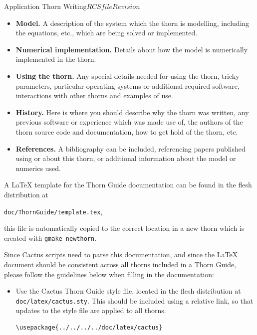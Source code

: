 \begin{cactuspart}{Application Thorn Writing}{$RCSfile$}{$Revision$}
\begin{itemize}

  \item{\bf Model.} A description of the system which the thorn is modelling,
    including the equations, etc., which are being solved or implemented.

  \item{\bf Numerical implementation.} Details about how the model is
    numerically implemented in the thorn.

  \item{\bf Using the thorn.} Any special details needed for using the
    thorn, tricky parameters, particular operating systems or additional
    required software, interactions with other thorns and examples of use.

  \item{\bf History.} Here is where you should describe why the thorn
    was written, any previous software or experience which was made use of,
    the authors of the thorn source code and documentation, how to get
    hold of the thorn, etc.

  \item{\bf References.} A bibliography can be included, referencing papers
    published using or about this thorn, or additional information about
    the model or numerics used.

\end{itemize}

A LaTeX template for the Thorn Guide documentation can be found in the
flesh distribution at

\texttt{doc/ThornGuide/template.tex},

this file is automatically copied to the correct location in a new thorn
which is created with \texttt{gmake newthorn}.

Since Cactus scripts need to parse this documentation, and since the
LaTeX document should be consistent across all thorns included in a
Thorn Guide, please follow the guidelines below when filling in the
documentation:

\begin{itemize}

  \item Use the Cactus Thorn Guide style file, located in the flesh
    distribution at \texttt{doc/latex/cactus.sty}. This should be
    included using a relative link, so that updates to the style file
    are applied to all thorns.
%
\begin{verbatim}
\usepackage{../../../../doc/latex/cactus}
\end{verbatim}


\end{itemize}
\end{cactuspart}
